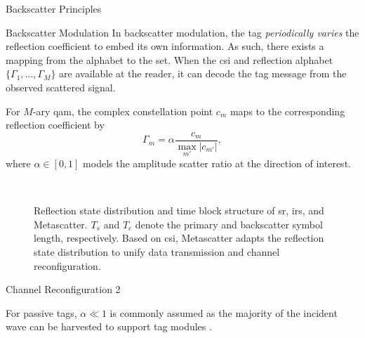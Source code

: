 \documentclass[journal]{IEEEtran}
\begin{document}
\begin{section}{Backscatter Principles}
	\begin{subsection}{Backscatter Modulation}
		In backscatter modulation, the tag \emph{periodically varies} the reflection coefficient to embed its own information.
		As such, there exists a mapping from the alphabet to the set.
		When the \gls{csi} and reflection alphabet $\{\Gamma_1,\ldots,\Gamma_M\}$ are available at the reader, it can decode the tag message from the observed scattered signal.



		For $M$-ary \gls{qam}, the complex constellation point $c_m$ maps to the corresponding reflection coefficient by \cite{Thomas2012a}
		\begin{equation}
			\Gamma_m = \alpha \frac{c_m}{\max_{m'} \lvert c_{m'} \rvert},
			\label{eq:backscatter_modulation}
		\end{equation}
		where $\alpha \in [0,1]$ models the amplitude scatter ratio at the direction of interest.



		\begin{figure}[!t]
			\centering
			\\
			\caption{Reflection state distribution and time block structure of \gls{sr}, \gls{irs}, and Metascatter. $T_s$ and $T_c$ denote the primary and backscatter symbol length, respectively. Based on \gls{csi}, Metascatter adapts the reflection state distribution to unify data transmission and channel reconfiguration.}
		\end{figure}



	\end{subsection}

	\begin{subsection}{Channel Reconfiguration}
		2
	\end{subsection}
	For passive tags, $\alpha \ll 1$ is commonly assumed as the majority of the incident wave can be harvested to support tag modules \cite{Thomas2012a}.


\end{section}
\end{document}

